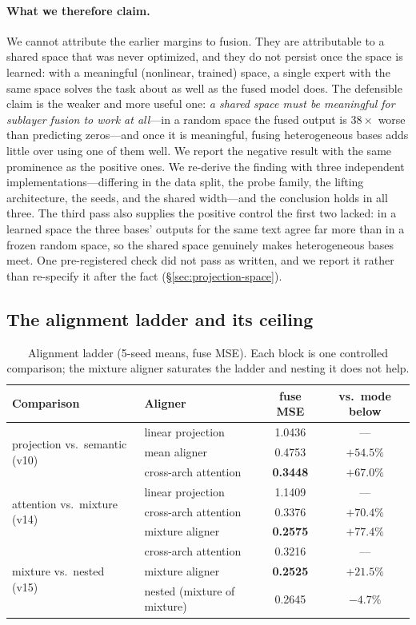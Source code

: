 \documentclass[10pt,twoside]{article}
\theoremstyle{definition}
\theoremstyle{plain}
\theoremstyle{remark}
\begin{document}
\paragraph{What we therefore claim.}
We cannot attribute the earlier margins to fusion. They are attributable to a shared space that
was never optimized, and they do not persist once the space is learned: with a meaningful
(nonlinear, trained) space, a single expert with the same space solves the task about as well as
the fused model does. The defensible claim is the weaker and more useful one: \emph{a shared space
must be meaningful for sublayer fusion to work at all}---in a random space the fused output is
$38\times$ worse than predicting zeros---and once it is meaningful, fusing heterogeneous bases
adds little over using one of them well. We report the negative result with the same prominence
as the positive ones. We re-derive the finding with three independent implementations---differing in the data split, the probe family, the lifting architecture, the seeds, and the shared width---and the conclusion holds in all three. The third pass also supplies the positive control the first two lacked: in a learned space the three bases' outputs for the same text agree far more than in a frozen random space, so the shared space genuinely makes heterogeneous bases meet. One pre-registered check did not pass as written, and we report it rather than re-specify it after the fact (\S\ref{sec:projection-space}).

\subsection{The alignment ladder and its ceiling}
\label{sec:align-exp}

\begin{table}[htbp]
\centering
\caption{Alignment ladder (5-seed means, fuse MSE). Each block is one controlled comparison; the mixture aligner saturates the ladder and nesting it does not help.}
\label{tab:ladder}
\begin{tabular}{llcc}
\toprule
\textbf{Comparison} & \textbf{Aligner} & \textbf{fuse MSE} & \textbf{vs.\ mode below} \\
\midrule
\multirow{3}{*}{projection vs.\ semantic (v10)}
 & linear projection & 1.0436 & --- \\
 & mean aligner & 0.4753 & $+54.5\%$ \\
 & cross-arch attention & \textbf{0.3448} & $+67.0\%$ \\
\midrule
\multirow{3}{*}{attention vs.\ mixture (v14)}
 & linear projection & 1.1409 & --- \\
 & cross-arch attention & 0.3376 & $+70.4\%$ \\
 & mixture aligner & \textbf{0.2575} & $+77.4\%$ \\
\midrule
\multirow{3}{*}{mixture vs.\ nested (v15)}
 & cross-arch attention & 0.3216 & --- \\
 & mixture aligner & \textbf{0.2525} & $+21.5\%$ \\
 & nested (mixture of mixture) & 0.2645 & $-4.7\%$ \\
\bottomrule
\end{tabular}
\end{table}
\end{document}
